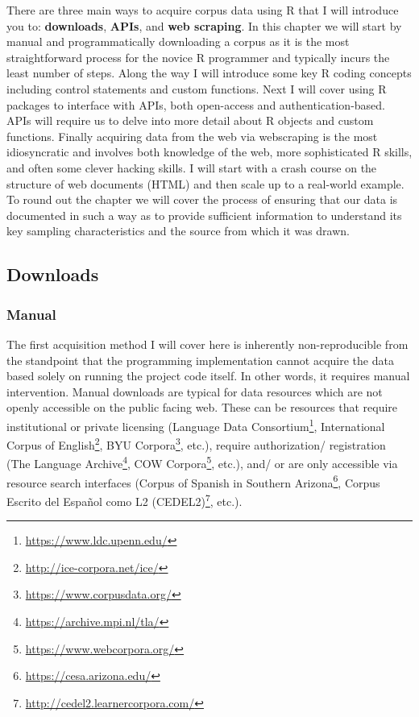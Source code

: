 \documentclass[
]{article}
\DeclareRobustCommand{\href}[2]{#2\footnote{\url{#1}}}
\begin{document}
There are three main ways to acquire corpus data using R that I will introduce you to: \textbf{downloads}, \textbf{APIs}, and \textbf{web scraping}. In this chapter we will start by manual and programmatically downloading a corpus as it is the most straightforward process for the novice R programmer and typically incurs the least number of steps. Along the way I will introduce some key R coding concepts including control statements and custom functions. Next I will cover using R packages to interface with APIs, both open-access and authentication-based. APIs will require us to delve into more detail about R objects and custom functions. Finally acquiring data from the web via webscraping is the most idiosyncratic and involves both knowledge of the web, more sophisticated R skills, and often some clever hacking skills. I will start with a crash course on the structure of web documents (HTML) and then scale up to a real-world example. To round out the chapter we will cover the process of ensuring that our data is documented in such a way as to provide sufficient information to understand its key sampling characteristics and the source from which it was drawn.

\hypertarget{downloads}{%
\subsection{Downloads}\label{downloads}}

\hypertarget{manual}{%
\subsubsection{Manual}\label{manual}}

The first acquisition method I will cover here is inherently non-reproducible from the standpoint that the programming implementation cannot acquire the data based solely on running the project code itself. In other words, it requires manual intervention. Manual downloads are typical for data resources which are not openly accessible on the public facing web. These can be resources that require institutional or private licensing (\href{https://www.ldc.upenn.edu/}{Language Data Consortium}, \href{http://ice-corpora.net/ice/}{International Corpus of English}, \href{https://www.corpusdata.org/}{BYU Corpora}, etc.), require authorization/ registration (\href{https://archive.mpi.nl/tla/}{The Language Archive}, \href{https://www.webcorpora.org/}{COW Corpora}, etc.), and/ or are only accessible via resource search interfaces (\href{https://cesa.arizona.edu/}{Corpus of Spanish in Southern Arizona}, \href{http://cedel2.learnercorpora.com/}{Corpus Escrito del Español como L2 (CEDEL2)}, etc.).
\end{document}
